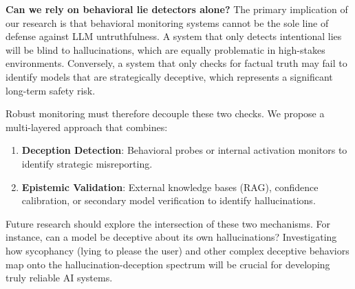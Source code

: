 {\bf Can we rely on behavioral lie detectors alone?} The primary implication of our research is that behavioral monitoring systems cannot be the sole line of defense against LLM untruthfulness.
 A system that only detects intentional lies will be blind to hallucinations, which are equally problematic in high-stakes environments. Conversely, a system that only checks for factual truth may fail to identify models that are strategically deceptive, which represents a significant long-term safety risk.

Robust monitoring must therefore decouple these two checks. We propose a multi-layered approach that combines:
\begin{enumerate}
    \item {\bf Deception Detection}: Behavioral probes or internal activation monitors to identify strategic misreporting.
    \item {\bf Epistemic Validation}: External knowledge bases (RAG), confidence calibration, or secondary model verification to identify hallucinations.
\end{enumerate}

Future research should explore the intersection of these two mechanisms. For instance, can a model be deceptive about its own hallucinations? Investigating how sycophancy (lying to please the user) and other complex deceptive behaviors map onto the hallucination-deception spectrum will be crucial for developing truly reliable AI systems.
